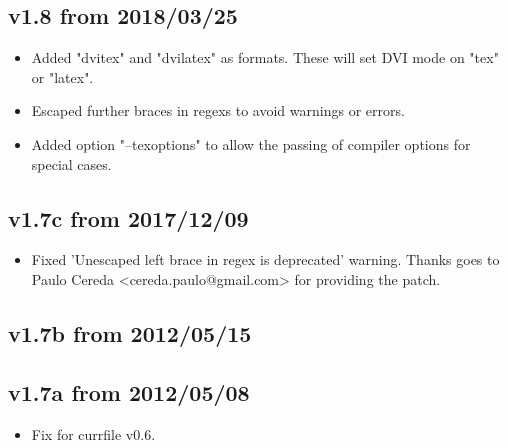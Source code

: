 \documentclass{article}
\begin{document}
\subsection*{v1.8 from 2018/03/25}
\begin{itemize}
 \item Added "dvitex" and "dvilatex" as formats. These will set DVI mode on "tex" or "latex".
 \item Escaped further braces in regexs to avoid warnings or errors.
 \item Added option "--texoptions" to allow the passing of compiler options for special cases.
\end{itemize}

\subsection*{v1.7c from 2017/12/09}
\begin{itemize}
 \item Fixed 'Unescaped left brace in regex is deprecated' warning.
   Thanks goes to Paulo Cereda <cereda.paulo@gmail.com> for providing the patch.
\end{itemize}

\subsection*{v1.7b from 2012/05/15}

\subsection*{v1.7a from 2012/05/08}
\begin{itemize}
 \item Fix for currfile v0.6.
\end{itemize}
\end{document}
